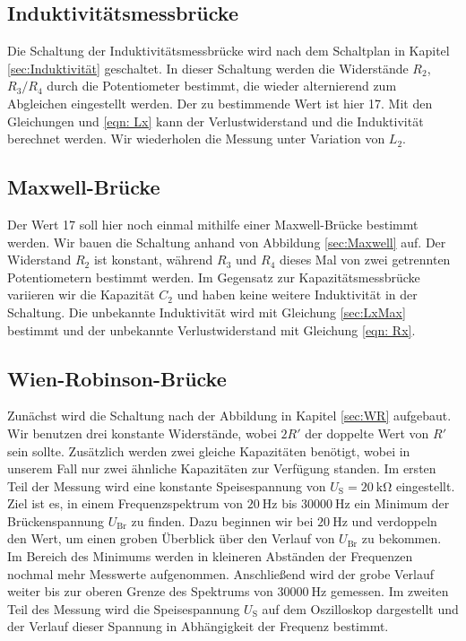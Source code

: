 \subsection{Induktivitätsmessbrücke}

    Die Schaltung der Induktivitätsmessbrücke wird nach dem Schaltplan in Kapitel \ref{sec:Induktivität} 
    geschaltet.
    In dieser Schaltung werden die Widerstände $R_2$, $R_3/R_4$ durch die Potentiometer bestimmt, die wieder 
    alternierend zum Abgleichen eingestellt werden.
    Der zu bestimmende Wert ist hier 17. 
    Mit den Gleichungen  und \eqref{eqn: Lx} kann der Verlustwiderstand und die Induktivität
    berechnet werden.
    Wir wiederholen die Messung unter Variation von $L_2$.

\subsection{Maxwell-Brücke}

    Der Wert 17 soll hier noch einmal mithilfe einer Maxwell-Brücke bestimmt werden.
    Wir bauen die Schaltung anhand von Abbildung \ref{sec:Maxwell} auf.
    Der Widerstand $R_2$ ist konstant, während $R_3$ und $R_4$ dieses Mal von zwei getrennten
    Potentiometern bestimmt werden.
    Im Gegensatz zur Kapazitätsmessbrücke variieren wir die Kapazität $C_2$ und haben keine weitere 
    Induktivität in der Schaltung.
    Die unbekannte Induktivität wird mit Gleichung \eqref{sec:LxMax} bestimmt und der unbekannte
    Verlustwiderstand mit Gleichung \eqref{eqn: Rx}.

\subsection{Wien-Robinson-Brücke}

    Zunächst wird die Schaltung nach der Abbildung in Kapitel \ref{sec:WR} aufgebaut.
    Wir benutzen drei konstante Widerstände, wobei $2R'$ der doppelte Wert von $R'$ sein sollte.
    Zusätzlich werden zwei gleiche Kapazitäten benötigt, wobei in unserem Fall nur zwei ähnliche Kapazitäten zur
    Verfügung standen.
    Im ersten Teil der Messung wird eine konstante Speisespannung von $U_\text{S} = \SI{20}{\kilo\ohm}$ eingestellt.
    Ziel ist es, in einem Frequenzspektrum von $\SI{20}{\hertz}$ bis $\SI{30000}{\hertz}$ ein 
    Minimum der Brückenspannung $U_\text{Br}$ zu finden.
    Dazu beginnen wir bei $\SI{20}{\hertz}$ und verdoppeln den Wert, um einen groben Überblick
    über den Verlauf von $U_\text{Br}$ zu bekommen. 
    Im Bereich des Minimums werden in kleineren Abständen der Frequenzen nochmal mehr Messwerte aufgenommen.
    Anschließend wird der grobe Verlauf weiter bis zur oberen Grenze des Spektrums von $\SI{30000}{\hertz}$ gemessen.
    Im zweiten Teil des Messung wird die Speisespannung $U_\text{S}$ auf dem Oszilloskop dargestellt 
    und der Verlauf dieser Spannung in Abhängigkeit der Frequenz bestimmt.